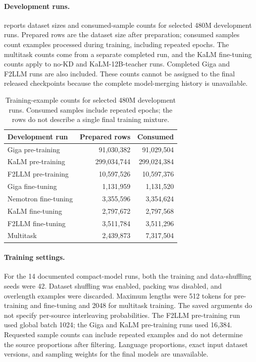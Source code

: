 \documentclass[11pt]{article}
\begin{document}
\paragraph{Development runs.}
 reports dataset sizes and consumed-sample counts for selected 480M development runs.
Prepared rows are the dataset size after preparation; consumed samples count examples processed during training, including repeated epochs.
The multitask counts come from a separate completed run, and the KaLM fine-tuning counts apply to no-KD and KaLM-12B-teacher runs.
Completed Giga and F2LLM runs are also included.
These counts cannot be assigned to the final released checkpoints because the complete model-merging history is unavailable.

\begin{table}[t]
  \caption{Training-example counts for selected 480M development runs. Consumed samples include repeated epochs; the rows do not describe a single final training mixture.}
  \label{tab:prepared-counts}
  \centering
  \footnotesize
  \setlength{\tabcolsep}{3pt}
  \begin{tabular}{lrr}
    \toprule
    \textbf{Development run} & \textbf{Prepared rows} & \textbf{Consumed} \\
    \midrule
    Giga pre-training     & 91,030,382 & 91,029,504 \\
    KaLM pre-training     & 299,034,744 & 299,024,384 \\
    F2LLM pre-training    & 10,597,526 & 10,597,376 \\
    Giga fine-tuning      & 1,131,959 & 1,131,520 \\
    Nemotron fine-tuning  & 3,355,596 & 3,354,624 \\
    KaLM fine-tuning      & 2,797,672 & 2,797,568 \\
    F2LLM fine-tuning     & 3,511,784 & 3,511,296 \\
    Multitask        & 2,439,873 & 7,317,504 \\
    \bottomrule
  \end{tabular}
\end{table}

\paragraph{Training settings.}
For the 14 documented compact-model runs, both the training and data-shuffling seeds were 42.
Dataset shuffling was enabled, packing was disabled, and overlength examples were discarded.
Maximum lengths were 512 tokens for pre-training and fine-tuning and 2048 for multitask training.
The saved arguments do not specify per-source interleaving probabilities.
The F2LLM pre-training run used global batch 1024; the Giga and KaLM pre-training runs used 16,384.
Requested sample counts can include repeated examples and do not determine the source proportions after filtering.
Language proportions, exact input dataset versions, and sampling weights for the final models are unavailable.
\end{document}
